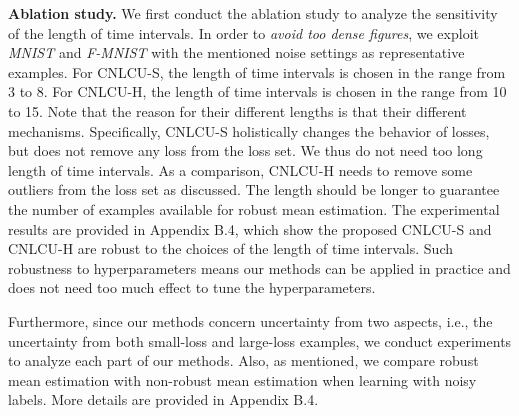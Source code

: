 \documentclass[11pt]{article}
\begin{document}
\textbf{Ablation study.} We first conduct the ablation study to analyze the sensitivity of the length of time intervals. In order to \textit{avoid too dense figures}, we exploit \textit{MNIST} and \textit{F-MNIST} with the mentioned noise settings as representative examples. For CNLCU-S, the length of time intervals is chosen in the range from 3 to 8. For CNLCU-H, the length of time intervals is chosen in the range from 10 to 15. Note that the reason for their different lengths is that their different mechanisms. Specifically,  CNLCU-S holistically changes the behavior of losses, but does not remove any loss from the loss set. We thus do not need too long length of time intervals. As a comparison, CNLCU-H needs to remove some outliers from the loss set as discussed. The length should be longer to guarantee the number of examples available for robust mean estimation. The experimental results are provided in Appendix B.4, which show the proposed CNLCU-S and CNLCU-H are robust to the choices of the length of time intervals. Such robustness to hyperparameters means our methods can be applied in practice and does not need too much effect to tune the hyperparameters. 

Furthermore, since our methods concern uncertainty from two aspects, i.e., the uncertainty from both small-loss and large-loss examples, we conduct experiments to analyze each part of our methods. Also, as mentioned, we compare robust mean estimation with non-robust mean estimation when learning with noisy labels. More details are provided in Appendix B.4. 
\end{document}
